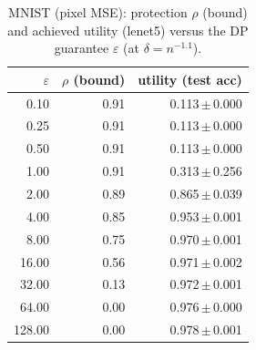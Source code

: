 \begin{table}[t]
  \centering
  \caption{MNIST (pixel MSE): protection $\rho$ (bound) and achieved utility (lenet5) versus the DP guarantee $\varepsilon$ (at $\delta=n^{-1.1}$).}
  \label{tab:util_mnist_mse}
  \begin{tabular}{r r r}
    \toprule
    $\varepsilon$ & $\rho$ (bound) & utility (test acc) \\
    \midrule
    0.10 & 0.91 & 0.113\,$\pm$\,0.000 \\
    0.25 & 0.91 & 0.113\,$\pm$\,0.000 \\
    0.50 & 0.91 & 0.113\,$\pm$\,0.000 \\
    1.00 & 0.91 & 0.313\,$\pm$\,0.256 \\
    2.00 & 0.89 & 0.865\,$\pm$\,0.039 \\
    4.00 & 0.85 & 0.953\,$\pm$\,0.001 \\
    8.00 & 0.75 & 0.970\,$\pm$\,0.001 \\
    16.00 & 0.56 & 0.971\,$\pm$\,0.002 \\
    32.00 & 0.13 & 0.972\,$\pm$\,0.001 \\
    64.00 & 0.00 & 0.976\,$\pm$\,0.000 \\
    128.00 & 0.00 & 0.978\,$\pm$\,0.001 \\
    \bottomrule
  \end{tabular}
\end{table}

